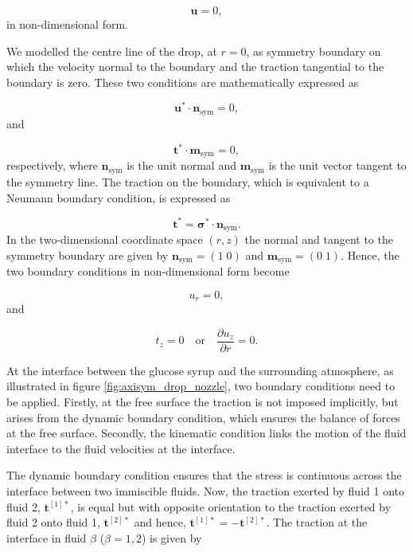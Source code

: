 \documentclass[aip,graphicx]{revtex4-1}
\newcommand{\sym}[1]{\text{#1}}
\newcommand{\pder}[2][]{\frac{\partial#1}{\partial#2}}
\newcommand{\vect}[1]{\bm{#1}}
\begin{document}
\begin{equation}
 \vect{u} = 0,
 \label{eqn:ns_eqn_solid_wall_bc_non_dim}
\end{equation}
in non-dimensional form.

We modelled the centre line of the drop, at $r=0$, as symmetry boundary on which the velocity normal to the boundary and the traction tangential to the boundary is zero. 
These two conditions are mathematically expressed as

\begin{equation}
 \vect{u}^* \cdot \vect{n}_{\sym{sym}} = 0,
\end{equation}
and

\begin{equation}
 \vect{t}^* \cdot \vect{m}_{\sym{sym}} = 0,
\end{equation}
respectively, where $\vect{n}_{\sym{sym}}$ is the unit normal and $\vect{m}_{\sym{sym}}$ is the unit vector tangent to the symmetry line.
The traction on the boundary, which is equivalent to a Neumann boundary condition, is expressed as

\begin{equation}
 \vect{t}^* = \vect{\sigma}^* \cdot \vect{n}_{\sym{sym}}.
 \label{eqn:ns_eqn_solid_wall_traction_bc}
\end{equation}
In the two-dimensional coordinate space $(r,z)$ the normal and tangent to the symmetry boundary are given by $\vect{n}_{\sym{sym}}= (1 \; 0)$ and $\vect{m}_{\sym{sym}} = (0 \; 1)$.
Hence, the two boundary conditions in non-dimensional form become

\begin{equation}
 u_r = 0,
 \label{eqn:ns_eqn_sym_bc_non_dim}
\end{equation}
and

\begin{equation}
 t_z = 0 \quad \text{or} \quad \pder[u_z]{r} = 0.
\end{equation}

At the interface between the glucose syrup and the surrounding atmosphere, as illustrated in figure \ref{fig:axisym_drop_nozzle}, two boundary conditions need to be applied. 
Firstly, at the free surface the traction is not imposed implicitly, but arises from the dynamic boundary condition, which ensures the balance of forces at the free surface. 
Secondly, the kinematic condition links the motion of the fluid interface to the fluid velocities at the interface.


The dynamic boundary condition ensures that the stress is continuous across the interface between two immiscible fluids. 
Now, the traction exerted by fluid 1 onto fluid 2, $\vect{t}^{[1]*}$, is equal but with opposite orientation to the traction exerted by fluid 2 onto fluid 1, $\vect{t}^{[2]*}$ and hence, $\vect{t}^{[1]*} = - \vect{t}^{[2]*}$. 
The traction at the interface in fluid $\beta$ ($\beta=1,2$) is given by
\end{document}
